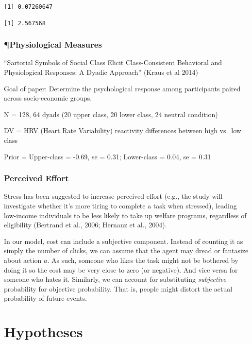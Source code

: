 \documentclass[
]{report}
\begin{document}
\begin{verbatim}
[1] 0.07260647
\end{verbatim}

\begin{verbatim}
[1] 2.567568
\end{verbatim}

\hypertarget{physiological-measures}{%
\subsubsection{¶Physiological Measures}\label{physiological-measures}}

``Sartorial Symbols of Social Class Elicit Class-Consistent Behavioral
and Physiological Responses: A Dyadic Approach'' (Kraus et al 2014)

Goal of paper: Determine the psychological response among participants
paired across socio-economic groups.

N = 128, 64 dyads (20 upper class, 20 lower class, 24 neutral condition)

DV = HRV (Heart Rate Variability) reactivity differences between high
vs.~low class

Prior = Upper-class = -0.69, se = 0.31; Lower-class = 0.04, se = 0.31

\hypertarget{perceived-effort-1}{%
\subsubsection{Perceived Effort}\label{perceived-effort-1}}

Stress has been suggested to increase perceived effort (e.g., the study
will investigate whether it's more tiring to complete a task when
stressed), leading low-income individuals to be less likely to take up
welfare programs, regardless of eligibility (Bertrand et al., 2006;
Hernanz et al., 2004).

In our model, cost can include a subjective component. Instead of
counting it as simply the number of clicks, we can assume that the agent
may dread or fantasize about action \(a\). As such, someone who likes
the task might not be bothered by doing it so the cost may be very close
to zero (or negative). And vice versa for someone who hates it.
Similarly, we can account for substituting \emph{subjective} probability
for objective probability. That is, people might distort the actual
probability of future events.

\hypertarget{hypotheses-2}{%
\section{Hypotheses}\label{hypotheses-2}}
\end{document}
